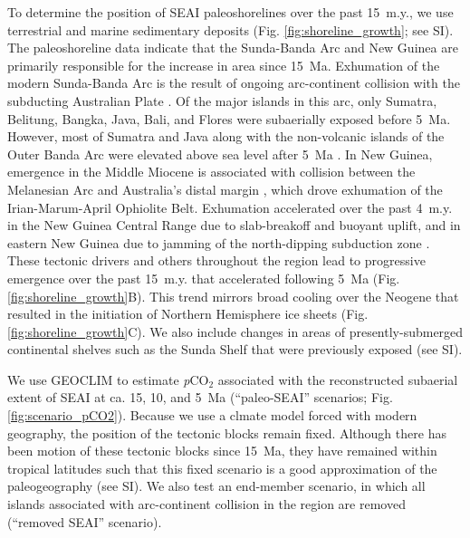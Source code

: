 \documentclass[9pt,twocolumn,twoside,lineno]{pnas-new}
\newcommand{\pCOtwo}{\textit{p}CO$_{2}$\xspace}
\begin{document}
To determine the position of SEAI paleoshorelines over the past 15~m.y., we use terrestrial and marine sedimentary deposits (Fig. \ref{fig:shoreline_growth}; see SI). The paleoshoreline data indicate that the Sunda-Banda Arc and New Guinea are primarily responsible for the increase in area since 15~Ma. Exhumation of the modern Sunda-Banda Arc is the result of ongoing arc-continent collision with the subducting Australian Plate \cite{Harris2006a}. Of the major islands in this arc, only Sumatra, Belitung, Bangka, Java, Bali, and Flores were subaerially exposed before 5~Ma. However, most of Sumatra and Java along with the non-volcanic islands of the Outer Banda Arc were elevated above sea level after 5~Ma \cite{Hall2013b}. In New Guinea, emergence in the Middle Miocene is associated with collision between the Melanesian Arc and Australia's distal margin \cite{Cloos2005a}, which drove exhumation of the Irian-Marum-April Ophiolite Belt. Exhumation accelerated over the past 4~m.y. in the New Guinea Central Range due to slab-breakoff and buoyant uplift, and in eastern New Guinea due to jamming of the north-dipping subduction zone \cite{Cloos2005a}. These tectonic drivers and others throughout the region lead to progressive emergence over the past 15~m.y. that accelerated following 5~Ma (Fig. \ref{fig:shoreline_growth}B). This trend mirrors broad cooling over the Neogene that resulted in the initiation of Northern Hemisphere ice sheets (Fig. \ref{fig:shoreline_growth}C). We also include changes in areas of presently-submerged continental shelves such as the Sunda Shelf that were previously exposed (see SI).

We use GEOCLIM to estimate \pCOtwo associated with the reconstructed subaerial extent of SEAI at ca. 15, 10, and 5~Ma (``paleo-SEAI'' scenarios; Fig. \ref{fig:scenario_pCO2}). Because we use a clmate model forced with modern geography, the position of the tectonic blocks remain fixed. Although there has been motion of these tectonic blocks since 15~Ma, they have remained within tropical latitudes such that this fixed scenario is a good approximation of the paleogeography (see SI). We also test an end-member scenario, in which all islands associated with arc-continent collision in the region are removed (``removed SEAI'' scenario).
\end{document}
